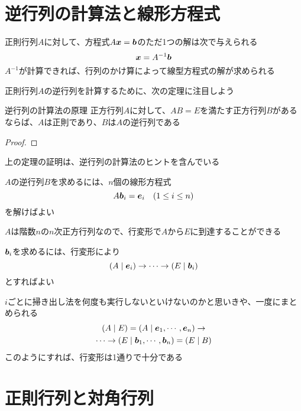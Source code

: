 \documentclass[../../../topic_linear-algebra]{subfiles}
\begin{document}
\sectionline
\section{逆行列の計算法と線形方程式}

正則行列$A$に対して、方程式$A\vb*{x} = \vb*{b}$のただ1つの解は次で与えられる
\begin{equation*}
  \vb*{x} = A^{-1} \vb*{b}
\end{equation*}
$A^{-1}$が計算できれば、行列のかけ算によって線型方程式の解が求められる

\sectionline

正則行列$A$の逆行列を計算するために、次の定理に注目しよう

\begin{theorem}{逆行列の計算法の原理}
  正方行列$A$に対して、$AB=E$を満たす正方行列$B$があるならば、$A$は正則であり、$B$は$A$の逆行列である
\end{theorem}

\begin{proof}
\end{proof}

上の定理の証明は、逆行列の計算法のヒントを含んでいる

$A$の逆行列$B$を求めるには、$n$個の線形方程式
\begin{equation*}
  A\vb*{b}_i = \vb*{e}_i \quad ( 1    \leq i \leq n )
\end{equation*}
を解けばよい

\br

$A$は階数$n$の$n$次正方行列なので、行変形で$A$から$E$に到達することができる

\br

$\vb*{b}_i$を求めるには、行変形により
\begin{equation*}
  (A \mid \vb*{e}_i) \rightarrow \cdots \rightarrow (E \mid \vb*{b}_i)
\end{equation*}
とすればよい

\br

$i$ごとに掃き出し法を何度も実行しないといけないのかと思いきや、一度にまとめられる
\begin{gather*}
  (A \mid E) = (A \mid \vb*{e}_1, \cdots , \vb*{e}_n) \rightarrow \\ \cdots \rightarrow (E \mid \vb*{b}_1 , \cdots , \vb*{b}_n) = (E \mid B)
\end{gather*}
このようにすれば、行変形は1通りで十分である

\sectionline
\section{正則行列と対角行列}
\end{document}
